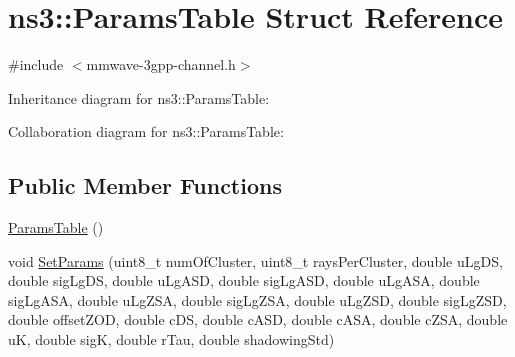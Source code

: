 \hypertarget{structns3_1_1ParamsTable}{}\section{ns3\+:\+:Params\+Table Struct Reference}
\label{structns3_1_1ParamsTable}


{\ttfamily \#include $<$mmwave-\/3gpp-\/channel.\+h$>$}



Inheritance diagram for ns3\+:\+:Params\+Table\+:


Collaboration diagram for ns3\+:\+:Params\+Table\+:
\subsection*{Public Member Functions}
\begin{DoxyCompactItemize}
\item 
\hyperlink{structns3_1_1ParamsTable_a207dcdd9da780db0085205f78e738b3f}{Params\+Table} ()
\item 
void \hyperlink{structns3_1_1ParamsTable_a1b14a2f6bb3f1f76f575b9cc784ba62c}{Set\+Params} (uint8\+\_\+t num\+Of\+Cluster, uint8\+\_\+t rays\+Per\+Cluster, double u\+Lg\+DS, double sig\+Lg\+DS, double u\+Lg\+A\+SD, double sig\+Lg\+A\+SD, double u\+Lg\+A\+SA, double sig\+Lg\+A\+SA, double u\+Lg\+Z\+SA, double sig\+Lg\+Z\+SA, double u\+Lg\+Z\+SD, double sig\+Lg\+Z\+SD, double offset\+Z\+OD, double c\+DS, double c\+A\+SD, double c\+A\+SA, double c\+Z\+SA, double uK, double sigK, double r\+Tau, double shadowing\+Std)
\end{DoxyCompactItemize}
